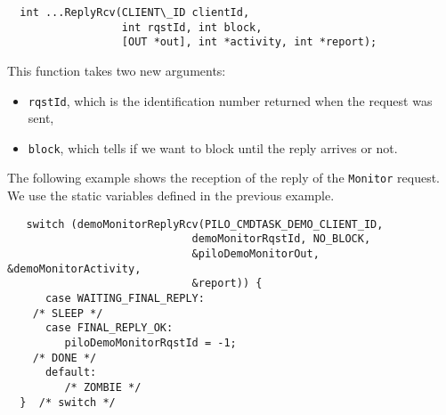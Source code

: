 \begin{center}\begin{cartouche}\small\begin{verbatim}
  int ...ReplyRcv(CLIENT\_ID clientId,
                  int rqstId, int block,
                  [OUT *out], int *activity, int *report);
\end{verbatim}\end{cartouche}\end{center}

This function takes two new arguments:
\begin{itemize}
\item \texttt{rqstId}, which is the identification number returned when the
request was sent,

\item \texttt{block}, which tells if we want to block until the
reply arrives or not.
\end{itemize}

The  following  example shows the  reception   of the  reply of  the 
\texttt{Monitor}  request.  We   use the static
variables defined in the previous example.


\begin{center}\begin{cartouche}\small\begin{verbatim}
   switch (demoMonitorReplyRcv(PILO_CMDTASK_DEMO_CLIENT_ID, 
                             demoMonitorRqstId, NO_BLOCK,
                             &piloDemoMonitorOut, &demoMonitorActivity, 
                             &report)) {
      case WAITING_FINAL_REPLY:
	/* SLEEP */
      case FINAL_REPLY_OK:
         piloDemoMonitorRqstId = -1;
	/* DONE */
      default:
         /* ZOMBIE */
  }  /* switch */
\end{verbatim}\end{cartouche}\end{center}


